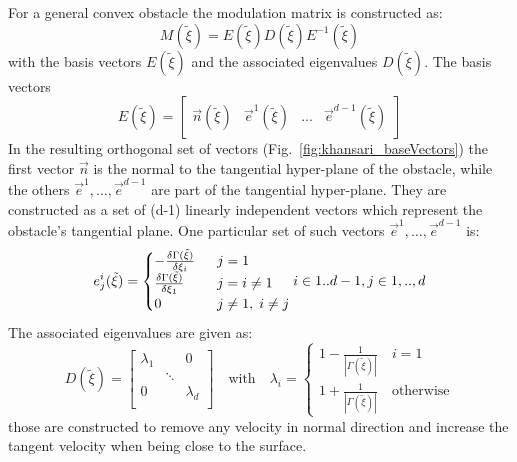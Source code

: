 For a general convex obstacle the modulation matrix is constructed as:
\begin{equation}
  M(\tilde \xi) = E(\tilde \xi) D(\tilde \xi) E^{-1}(\tilde \xi) \label{eq:modMatrix}
\end{equation}
with  the basis vectors $E(\tilde \xi)$ and the associated eigenvalues $D(\tilde \xi)$. The basis vectors
\begin{equation}
  E(\tilde \xi) =
  \begin{bmatrix}
    \vec n(\tilde \xi) & \vec e^1(\tilde \xi) & ... & \vec e^{d-1}(\tilde \xi)
  \end{bmatrix}
\end{equation}
In the resulting orthogonal set of vectors (Fig.~\ref{fig:khansari_baseVectors}) the first vector $\vec n$ is the normal to the tangential hyper-plane of the obstacle, while the others $\vec e^1, \hdots, \vec e^{d-1}$ are part of the tangential hyper-plane. They are constructed as a set of (d-1) linearly independent vectors which represent the obstacle's tangential plane. One particular set of such vectors $\vec e^1, \hdots , \vec e^{d-1}$ is:
\begin{equation}
  e_j^i (\tilde \xi) =
  \begin{cases}
    - \frac{\delta \Gamma (\tilde \xi)}{\delta \xi_i} \hspace{0.2cm}  & j=1 \\
    \frac{\delta \Gamma (\tilde \xi)}{\delta \xi_1} \;  &j=i \neq 1 \\
    0 \; & j\neq 1, \; i \neq j
  \end{cases}
  i \in {1..d-1}, j \in {1,..,d} \label{eq:eigValues}
\end{equation}
The associated eigenvalues are given as:
\begin{equation}
  D(\tilde \xi) =
  \begin{bmatrix}
     \lambda_1 & & 0 \\
     & \ddots &  \\
    0 & & \lambda_d \\
  \end{bmatrix}
  \quad \text{with} \quad
  \lambda_i =
  \begin{cases}
    1- \frac{1}{|\Gamma(\tilde \xi)|} \quad i =1 \\
    1 + \frac{1}{|\Gamma(\tilde \xi)|} \quad \text{otherwise}
  \end{cases}
\end{equation}
those are constructed to remove any velocity in normal direction and increase the tangent velocity when being close to the surface.


